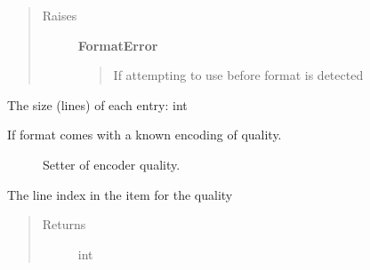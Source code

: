 \documentclass[letterpaper,10pt,english]{sphinxmanual}
\begin{document}
\begin{fulllineitems}
\begin{fulllineitems}
\begin{quote}
\begin{description}
\item[{Raises}] \leavevmode
\textbf{FormatError}
\begin{quote}

If attempting to use before format is detected
\end{quote}

\end{description}\end{quote}

\end{fulllineitems}


\begin{fulllineitems}
\label{fseq.reading:fseq.reading.seq_encoder.SeqFormatDetector.itemSize}
The size (lines) of each entry: int

\end{fulllineitems}


\begin{fulllineitems}
\label{fseq.reading:fseq.reading.seq_encoder.SeqFormatDetector.qualityEncoding}
If format comes with a known encoding of quality.



\begin{description}
\item[{{\hyperref[fseq.reading:fseq.reading.seq_encoder.SeqEncoder.qualityEncoding]{}}}] \leavevmode
Setter of encoder quality.

\end{description}



\end{fulllineitems}


\begin{fulllineitems}
\label{fseq.reading:fseq.reading.seq_encoder.SeqFormatDetector.qualityLine}
The line index in the item for the quality
\begin{quote}\begin{description}
\item[{Returns}] \leavevmode
int


\end{description}
\end{quote}
\end{fulllineitems}
\end{fulllineitems}
\end{document}
